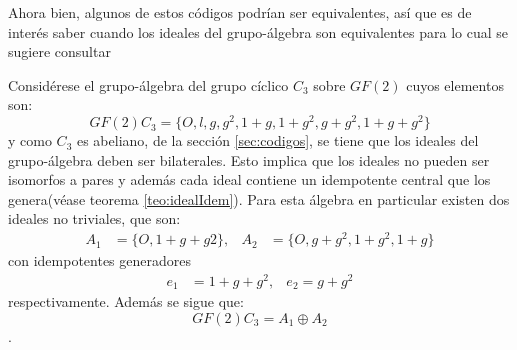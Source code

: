 Ahora bien, algunos de estos códigos podrían ser equivalentes, así que es de interés saber cuando los ideales del grupo-álgebra son equivalentes para lo cual se sugiere consultar \cite[p. 43-45]{bib:codeBook} 

\begin{ejemplo}
Considérese el grupo-álgebra del grupo cíclico $C_3$ sobre $GF(2)$ cuyos elementos son:\[ GF(2)C_3 = \{O, l,g,g^2, 1 +g, 1 +g^2,g+g^2, 1 +g+g^2\} \]
y como $C_3$ es abeliano, de la sección \ref{sec:codigos}, se tiene que los ideales del grupo-álgebra deben ser bilaterales. Esto implica que los ideales no pueden ser isomorfos a pares y además cada ideal contiene un idempotente central que los genera(véase teorema \ref{teo:idealIdem}). Para esta álgebra en particular existen dos ideales no triviales, que son:
\begin{align*}
A_1 &= \{O, 1 + g + g2\}, & A_2 &=\{O,g+g^2, 1 +g^2, 1 +g\}
\end{align*}
con idempotentes generadores
\begin{align*}
e_1 &= 1 + g + g^2, & e_2 = g + g^2
\end{align*}
respectivamente. Además se sigue que: \[ GF(2)C_3 = A_1 \oplus A_2\].
\end{ejemplo} 



